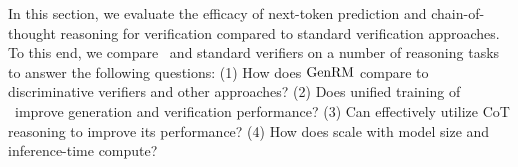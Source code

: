 
In this section, we evaluate the efficacy of next-token prediction and chain-of-thought reasoning for verification compared to standard verification approaches. To this end, we compare \genV\ and standard verifiers on a number of reasoning tasks to answer the following questions: (1) How does ${\text{GenRM}}$ compare to discriminative verifiers and other approaches? (2) Does unified training of \genV\ improve generation and verification performance? (3) Can {\genV} effectively utilize CoT reasoning to improve its performance? (4)
How does {\genV} scale with model size and inference-time compute?




